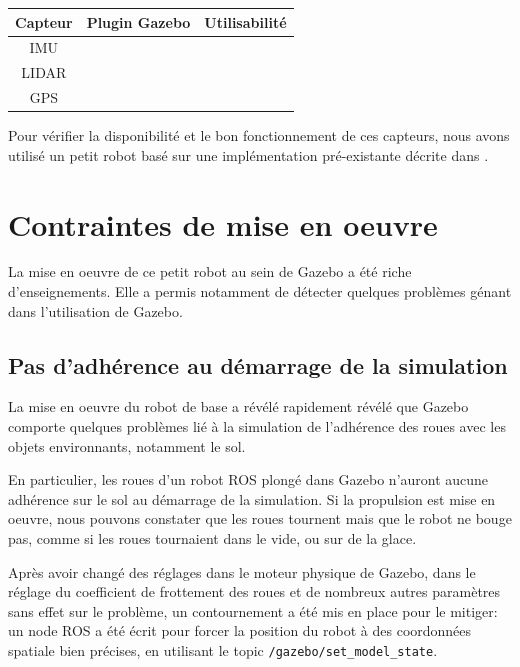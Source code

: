 \documentclass[12pt,a4paper]{report}
\begin{document}
		\begin{tabular}{|c|c|c|}
			\hline 
			Capteur & Plugin Gazebo & Utilisabilité \\ 
			\hline 
			IMU &  &  \\ 
			\hline 
			LIDAR &  &  \\ 
			\hline 
			GPS &  &  \\ 
			\hline 
		\end{tabular} 
	
		\para Pour vérifier la disponibilité et le bon fonctionnement de ces capteurs, nous avons utilisé un petit robot basé sur une implémentation pré-existante décrite dans .
		
		

		
\section{Contraintes de mise en oeuvre}
	
	\para La mise en oeuvre de ce petit robot au sein de Gazebo a été riche d'enseignements. Elle a permis notamment de détecter quelques problèmes génant dans l'utilisation de Gazebo.
	
		\subsection{Pas d'adhérence au démarrage de la simulation}
		
		La mise en oeuvre du robot de base a révélé rapidement révélé que Gazebo comporte quelques problèmes  lié à la simulation de l'adhérence des roues avec les objets environnants, notamment le sol.
		
		\para En particulier, les roues d'un robot ROS plongé dans Gazebo n'auront aucune adhérence sur le sol au démarrage de la simulation. Si la propulsion est mise en oeuvre, nous pouvons constater que les roues tournent mais que le robot ne bouge pas, comme si les roues tournaient dans le vide, ou sur de la glace.
		
		\para Après avoir changé des réglages dans le moteur physique de Gazebo, dans le réglage du coefficient de frottement des roues et de nombreux autres paramètres sans effet sur le problème, un contournement a été mis en place pour le mitiger: un node ROS a été écrit pour forcer la position du robot à des coordonnées spatiale bien précises, en utilisant le topic \verb|/gazebo/set_model_state|.
		
\end{document}

